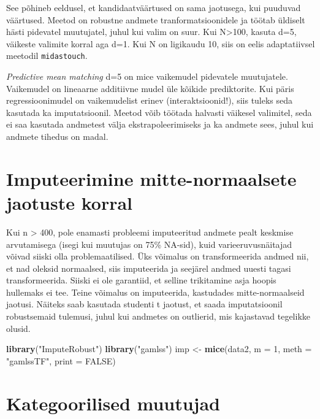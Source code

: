 \documentclass[]{book}
\newenvironment{Shaded}{\begin{snugshade}}{\end{snugshade}}
\newcommand{\DataTypeTok}[1]{\textcolor[rgb]{0.13,0.29,0.53}{#1}}
\newcommand{\DecValTok}[1]{\textcolor[rgb]{0.00,0.00,0.81}{#1}}
\newcommand{\KeywordTok}[1]{\textcolor[rgb]{0.13,0.29,0.53}{\textbf{#1}}}
\newcommand{\NormalTok}[1]{#1}
\newcommand{\OtherTok}[1]{\textcolor[rgb]{0.56,0.35,0.01}{#1}}
\newcommand{\StringTok}[1]{\textcolor[rgb]{0.31,0.60,0.02}{#1}}
\begin{document}
See põhineb eeldusel, et kandidaatväärtused on sama jaotusega, kui puuduvad väärtused. Meetod on robustne andmete tranformatsioonidele ja töötab üldiselt hästi pidevatel muutujatel, juhul kui valim on suur. Kui N\textgreater{}100, kasuta d=5, väikeste valimite korral aga d=1. Kui N on ligikaudu 10, siis on eelis adaptatiivsel meetodil \texttt{midastouch}.

\emph{Predictive mean matching} d=5 on mice vaikemudel pidevatele muutujatele.
Vaikemudel on lineaarne additiivne mudel üle kõikide prediktorite. Kui päris regressioonimudel on vaikemudelist erinev (interaktsioonid!), siis tuleks seda kasutada ka imputatsioonil. Meetod võib töötada halvasti väikesel valimitel, seda ei saa kasutada andmetest välja ekstrapoleerimiseks ja ka andmete sees, juhul kui andmete tihedus on madal.

\hypertarget{imputeerimine-mitte-normaalsete-jaotuste-korral}{%
\section{Imputeerimine mitte-normaalsete jaotuste korral}\label{imputeerimine-mitte-normaalsete-jaotuste-korral}}

Kui n \textgreater{} 400, pole enamasti probleemi imputeeritud andmete pealt keskmise arvutamisega (isegi kui muutujas on 75\% NA-sid), kuid varieeruvusnäitajad võivad siiski olla problemaatilised. Üks võimalus on transformeerida andmed nii, et nad oleksid normaalsed, siis imputeerida ja seejärel andmed uuesti tagasi transformeerida. Siiski ei ole garantiid, et selline trikitamine asja hoopis hullemaks ei tee. Teine võimalus on imputeerida, kastudades mitte-normaalseid jaotusi. Näiteks saab kasutada studenti t jaotust, et saada imputatsioonil robustsemaid tulemusi, juhul kui andmetes on outlierid, mis kajastavad tegelikke olusid.

\begin{Shaded}
\begin{Highlighting}[]
\KeywordTok{library}\NormalTok{(}\StringTok{"ImputeRobust"}\NormalTok{)}
\KeywordTok{library}\NormalTok{(}\StringTok{"gamlss"}\NormalTok{)}
\NormalTok{imp <-}\StringTok{ }\KeywordTok{mice}\NormalTok{(data2, }\DataTypeTok{m =} \DecValTok{1}\NormalTok{, }\DataTypeTok{meth =} \StringTok{"gamlssTF"}\NormalTok{, }\DataTypeTok{print =} \OtherTok{FALSE}\NormalTok{)}
\end{Highlighting}
\end{Shaded}

\hypertarget{kategoorilised-muutujad}{%
\section{Kategoorilised muutujad}\label{kategoorilised-muutujad}}
\end{document}
